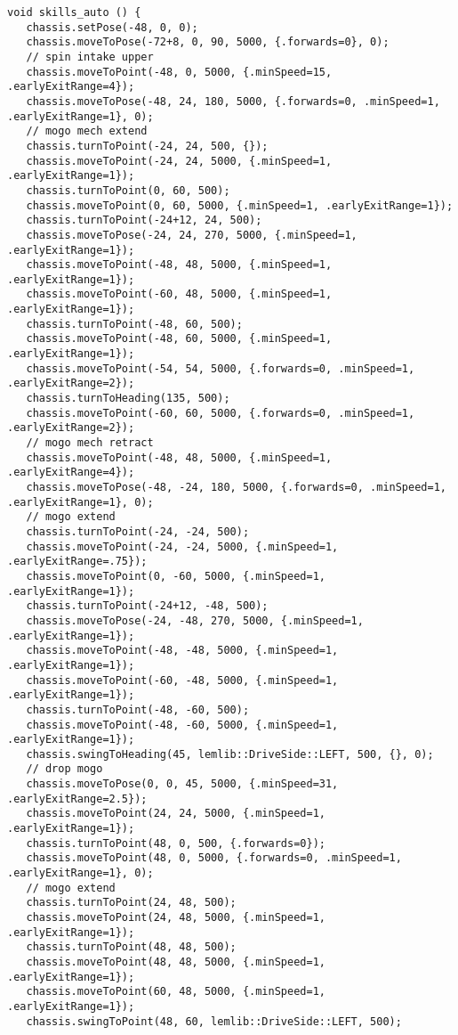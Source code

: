 \begin{verbatim}
void skills_auto () {
   chassis.setPose(-48, 0, 0);
   chassis.moveToPose(-72+8, 0, 90, 5000, {.forwards=0}, 0);
   // spin intake upper
   chassis.moveToPoint(-48, 0, 5000, {.minSpeed=15, .earlyExitRange=4});
   chassis.moveToPose(-48, 24, 180, 5000, {.forwards=0, .minSpeed=1, .earlyExitRange=1}, 0);
   // mogo mech extend
   chassis.turnToPoint(-24, 24, 500, {});
   chassis.moveToPoint(-24, 24, 5000, {.minSpeed=1, .earlyExitRange=1});
   chassis.turnToPoint(0, 60, 500);
   chassis.moveToPoint(0, 60, 5000, {.minSpeed=1, .earlyExitRange=1});
   chassis.turnToPoint(-24+12, 24, 500);
   chassis.moveToPose(-24, 24, 270, 5000, {.minSpeed=1, .earlyExitRange=1});
   chassis.moveToPoint(-48, 48, 5000, {.minSpeed=1, .earlyExitRange=1});
   chassis.moveToPoint(-60, 48, 5000, {.minSpeed=1, .earlyExitRange=1});
   chassis.turnToPoint(-48, 60, 500);
   chassis.moveToPoint(-48, 60, 5000, {.minSpeed=1, .earlyExitRange=1});
   chassis.moveToPoint(-54, 54, 5000, {.forwards=0, .minSpeed=1, .earlyExitRange=2});
   chassis.turnToHeading(135, 500);
   chassis.moveToPoint(-60, 60, 5000, {.forwards=0, .minSpeed=1, .earlyExitRange=2});
   // mogo mech retract
   chassis.moveToPoint(-48, 48, 5000, {.minSpeed=1, .earlyExitRange=4});
   chassis.moveToPose(-48, -24, 180, 5000, {.forwards=0, .minSpeed=1, .earlyExitRange=1}, 0);
   // mogo extend
   chassis.turnToPoint(-24, -24, 500);
   chassis.moveToPoint(-24, -24, 5000, {.minSpeed=1, .earlyExitRange=.75});
   chassis.moveToPoint(0, -60, 5000, {.minSpeed=1, .earlyExitRange=1});
   chassis.turnToPoint(-24+12, -48, 500);
   chassis.moveToPose(-24, -48, 270, 5000, {.minSpeed=1, .earlyExitRange=1});
   chassis.moveToPoint(-48, -48, 5000, {.minSpeed=1, .earlyExitRange=1});
   chassis.moveToPoint(-60, -48, 5000, {.minSpeed=1, .earlyExitRange=1});
   chassis.turnToPoint(-48, -60, 500);
   chassis.moveToPoint(-48, -60, 5000, {.minSpeed=1, .earlyExitRange=1});
   chassis.swingToHeading(45, lemlib::DriveSide::LEFT, 500, {}, 0);
   // drop mogo
   chassis.moveToPose(0, 0, 45, 5000, {.minSpeed=31, .earlyExitRange=2.5});
   chassis.moveToPoint(24, 24, 5000, {.minSpeed=1, .earlyExitRange=1});
   chassis.turnToPoint(48, 0, 500, {.forwards=0});
   chassis.moveToPoint(48, 0, 5000, {.forwards=0, .minSpeed=1, .earlyExitRange=1}, 0);
   // mogo extend
   chassis.turnToPoint(24, 48, 500);
   chassis.moveToPoint(24, 48, 5000, {.minSpeed=1, .earlyExitRange=1});
   chassis.turnToPoint(48, 48, 500);
   chassis.moveToPoint(48, 48, 5000, {.minSpeed=1, .earlyExitRange=1});
   chassis.moveToPoint(60, 48, 5000, {.minSpeed=1, .earlyExitRange=1});
   chassis.swingToPoint(48, 60, lemlib::DriveSide::LEFT, 500);

\end{verbatim}
